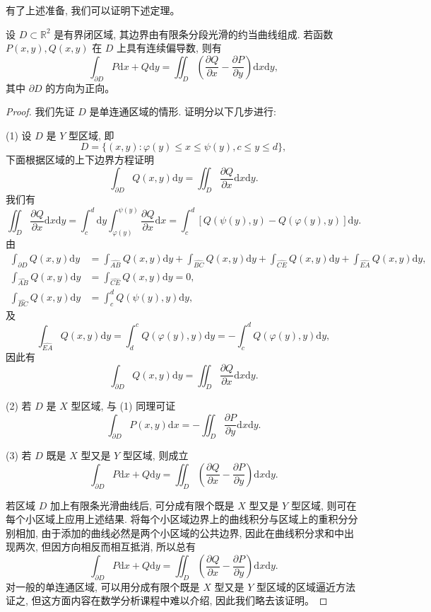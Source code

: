 \documentclass[12pt,fontset=fandol]{ctexart}
\begin{document}
有了上述准备, 我们可以证明下述定理。

\begin{theorem}[格林公式]\label{course-theorem-16-5-1}\quad 设 $D\subset\mathbb R^2$ 是有界闭区域, 其边界由有限条分段光滑的约当曲线组成. 若函数 $P(x,y),Q(x,y)$ 在 $D$ 上具有连续偏导数, 则有
\[
  \int_{\partial D}P\mathrm dx+Q\mathrm dy
  =\iint_D\left(\frac{\partial Q}{\partial x}-\frac{\partial P}{\partial y}\right)\mathrm dx\mathrm dy,
\]
其中 $\partial D$ 的方向为正向。

\end{theorem}
\begin{proof}\quad 我们先证 $D$ 是单连通区域的情形. 证明分以下几步进行:

(1) 设 $D$ 是 $Y$ 型区域, 即
\[
  D=\{(x,y):\varphi(y)\leqslant x\leqslant\psi(y),c\leqslant y\leqslant d\},
\]
下面根据区域的上下边界方程证明
\[
  \int_{\partial D}Q(x,y)\mathrm dy=\iint_D\frac{\partial Q}{\partial x}\mathrm dx\mathrm dy.
\]
我们有
\[
  \iint_D\frac{\partial Q}{\partial x}\mathrm dx\mathrm dy
  =\int_c^d\mathrm dy\int_{\varphi(y)}^{\psi(y)}
  \frac{\partial Q}{\partial x}\mathrm dx
  =\int_c^d[Q(\psi(y),y)-Q(\varphi(y),y)]\mathrm dy.
\]
由
\[
\begin{aligned}
  \int_{\partial D}Q(x,y)\mathrm dy
  &=\int_{\widehat{AB}}Q(x,y)\mathrm dy+\int_{\widehat{BC}}Q(x,y)\mathrm dy
    +\int_{\widehat{CE}}Q(x,y)\mathrm dy+\int_{\widehat{EA}}Q(x,y)\mathrm dy,\\
  \int_{\widehat{AB}}Q(x,y)\mathrm dy&=\int_{\widehat{CE}}Q(x,y)\mathrm dy=0,\\
  \int_{\widehat{BC}}Q(x,y)\mathrm dy&=\int_c^d Q(\psi(y),y)\mathrm dy,
\end{aligned}
\]
及
\[
  \int_{\widehat{EA}}Q(x,y)\mathrm dy
  =\int_d^cQ(\varphi(y),y)\mathrm dy
  =-\int_c^dQ(\varphi(y),y)\mathrm dy,
\]
因此有
\[
  \int_{\partial D}Q(x,y)\mathrm dy=\iint_D\frac{\partial Q}{\partial x}\mathrm dx\mathrm dy.
\]

(2) 若 $D$ 是 $X$ 型区域, 与 (1) 同理可证
\[
  \int_{\partial D}P(x,y)\mathrm dx=-\iint_D\frac{\partial P}{\partial y}\mathrm dx\mathrm dy.
\]

(3) 若 $D$ 既是 $X$ 型又是 $Y$ 型区域, 则成立
\[
  \int_{\partial D}P\mathrm dx+Q\mathrm dy
  =\iint_D\left(\frac{\partial Q}{\partial x}-\frac{\partial P}{\partial y}\right)\mathrm dx\mathrm dy.
\]

若区域 $D$ 加上有限条光滑曲线后, 可分成有限个既是 $X$ 型又是 $Y$ 型区域, 则可在每个小区域上应用上述结果. 将每个小区域边界上的曲线积分与区域上的重积分分别相加, 由于添加的曲线必然是两个小区域的公共边界, 因此在曲线积分求和中出现两次, 但因方向相反而相互抵消, 所以总有
\[
  \int_{\partial D}P\mathrm dx+Q\mathrm dy
  =\iint_D\left(\frac{\partial Q}{\partial x}-\frac{\partial P}{\partial y}\right)\mathrm dx\mathrm dy.
\]
对一般的单连通区域, 可以用分成有限个既是 $X$ 型又是 $Y$ 型区域的区域逼近方法证之, 但这方面内容在数学分析课程中难以介绍, 因此我们略去该证明。


\end{proof}
\end{document}
